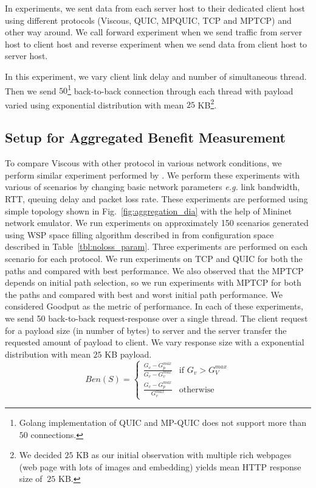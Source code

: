 In experiments, we sent data from each server host to their dedicated client host using different protocols (Viscous, QUIC, MPQUIC, TCP and MPTCP) and other way around. We call forward experiment when we send traffic from server host to client host and reverse experiment when we send data from client host to server host.

In this experiment, we vary client link delay and number of simultaneous thread. Then we send $50$\footnote{Golang implementation of QUIC and MP-QUIC does not support more than $50$ connections.} back-to-back connection through each thread with payload varied using exponential distribution with mean $25$ KB\footnote{We decided $25$ KB as our initial observation with multiple rich webpages (web page with lots of images and embedding) yields mean HTTP response size of $~25$ KB.}. 

\subsection{Setup for Aggregated Benefit Measurement}
To compare Viscous with other protocol in various network conditions, we perform similar experiment performed by \cite{mpquic-measure,Paasch:mptcp:compare}. We perform these experiments with various of scenarios by changing basic network parameters {\it e.g.} link bandwidth, RTT, queuing delay and packet loss rate. These experiments are performed using simple topology shown in Fig.~\ref{fig:aggregation_dia} with the help of Mininet network emulator. We run experiments on approximately 150 scenarios generated using WSP space filling algorithm described in \cite{wspalgo} from configuration space described in Table~\ref{tbl:noloss_param}. Three experiments are performed on each scenario for each protocol. We run experiments on TCP and QUIC for both the paths and compared with best performance. We also observed that the MPTCP depends on initial path selection, so we run experiments with MPTCP for both the paths and compared with best and worst initial path performance. We considered Goodput as the metric of performance. In each of these experiments, we send 50 back-to-back request-response over a single thread. The client request for a payload size (in number of bytes) to server and the server transfer the requested amount of payload to client. We vary response size with a exponential distribution with mean $25$ KB payload.
\begin{equation} \label{eqn:agre_benefit}
Ben(S) = 
\begin{cases}
\frac{G_v - G_p^{max}}{G_v - G_v^{max}} & \text{if } G_v > G_V^{max} \\
\frac{G_v - G_p^{max}}{G_v^{max}} & \text{otherwise}
\end{cases}
\end{equation}

